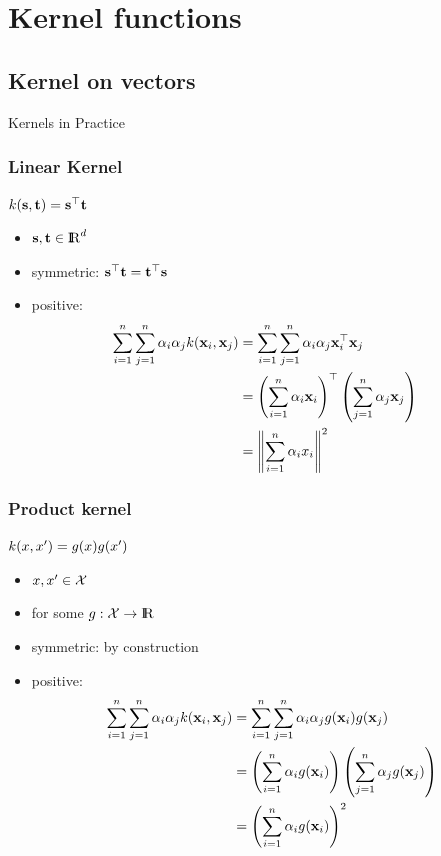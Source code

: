 \documentclass[11pt, pdf, compress, handout]{beamer}
\begin{document}
\section{Kernel functions}
\subsection{Kernel on vectors}
\begin{frame}[plain]
  \begin{center} {\Huge Kernels in Practice}
  \end{center}

\end{frame}
\begin{frame}
  \frametitle{Linear Kernel}
  \begin{block}{${\mathnormal{k}}({\mathbf{s}},{\mathbf{t}}) = {\mathbf{s}}^\top {\mathbf{t}} $}
    \begin{itemize}
    \item  ${\mathbf{s}},{\mathbf{t}}\in {\mathrm{I\hskip-2.2pt R}}^d$
    \item symmetric: ${\mathbf{s}}^\top {\mathbf{t}} = {\mathbf{t}}^\top {\mathbf{s}}$
      
    \item positive:
      \begin{align*}
        \sum_{i=1}^n \sum_{j=1}^n \alpha_i \alpha_j {\mathnormal{k}}({\mathbf{x}}_i,{\mathbf{x}}_j)
        & = \sum_{i=1}^n \sum_{j=1}^n \alpha_i \alpha_j {\mathbf{x}}_i^\top {\mathbf{x}}_j & \\
        & = \left(\sum_{i=1}^n \alpha_i {\mathbf{x}}_i \right)^\top
          \left(\sum_{j=1}^n \alpha_j {\mathbf{x}}_j \right) \\
        & = \left\|\sum_{i=1}^n
          \alpha_i x_i \right\|^2
      \end{align*}
    \end{itemize}
  \end{block}
\end{frame}
             
\begin{frame}
  \frametitle{Product kernel}
  \begin{block}{${\mathnormal{k}}({\mathnormal{x}},{\mathnormal{x}}') = g({\mathnormal{x}}) g({\mathnormal{x}}')$}
    \begin{itemize}
    \item ${\mathnormal{x}}, {\mathnormal{x}}'\in {\mathcal{X}}$
    \item for some $g: {\mathcal{X}} \to {\mathrm{I\hskip-2.2pt R}}$
    \item symmetric: by construction
    \item positive:
      \begin{align*}
        \sum_{i=1}^n \sum_{j=1}^n \alpha_i \alpha_j k({\mathbf{x}}_i,{\mathbf{x}}_j)
        & = \sum_{i=1}^n \sum_{j=1}^n \alpha_i \alpha_j g({\mathbf{x}}_i) g({\mathbf{x}}_j)  \\
        & = \left(\sum_{i=1}^n \alpha_i g({\mathbf{x}}_i)\right)
            \left(\sum_{j=1}^n \alpha_j g({\mathbf{x}}_j)\right) \\
        & = \left(\sum_{i=1}^n \alpha_i g({\mathbf{x}}_i)\right)^2
      \end{align*}
    \end{itemize}
    \end{block}
\end{frame}
\end{document}
